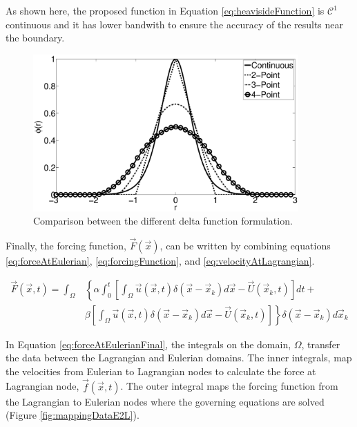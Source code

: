 \documentclass[12pt]{aiaa-pretty}
\begin{document}
As shown here, the proposed function in Equation \eqref{eq:heavisideFunction} is $\mathcal{C}^1$ continuous and it has lower bandwith to ensure the accuracy of the results near the boundary.

%
\begin{figure}[H]
	\centering
	\includegraphics[height=6.0cm]{figure/heaviside_comparison.eps}
	\caption{Comparison between the different delta function formulation.}
	\label{fig:heavisideComparison}
\end{figure}
%

Finally, the forcing function, $\vec{F}(\vec{x})$, can be written by combining equations \eqref{eq:forceAtEulerian}, \eqref{eq:forcingFunction}, and \eqref{eq:velocityAtLagrangian}.

%
\begin{equation}
\begin{aligned}\label{eq:forceAtEulerianFinal}
	\vec{F}(\vec{x}, t) = 
	\int_\Omega 
	&\left\{
 	\alpha \int_0^t
	\left[
	\int_\Omega \vec{u} (\vec{x}, t) \delta(\vec{x} - \vec{x}_k) d\vec{x} - \vec{U}\left( \vec{x}_k, t \right)
	\right]dt + \right. \\
	&\left.
	\beta \left[
	\int_\Omega \vec{u} (\vec{x}, t) \delta(\vec{x} - \vec{x}_k) d\vec{x} - \vec{U}\left( \vec{x}_k, t \right)
	\right]
	\right\} \delta(\vec{x} - \vec{x}_k) d\vec{x}_k
\end{aligned}
\end{equation}
%

In Equation \eqref{eq:forceAtEulerianFinal}, the integrals on the domain, $\Omega$, transfer the data between the Lagrangian and Eulerian domains. The inner integrals, map the velocities from Eulerian to Lagrangian nodes to calculate the force at Lagrangian node, $\vec{f}\left( \vec{x}, t \right)$. The outer integral maps the forcing function from the Lagrangian to Eulerian nodes where the governing equations are solved (Figure \ref{fig:mappingDataE2L}).
\end{document}
